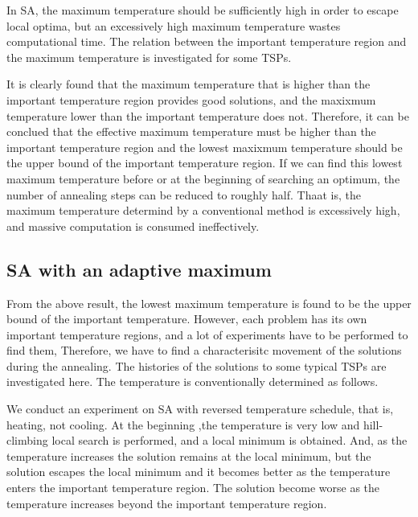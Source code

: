 \documentclass[pdftex,11pt]{article}
\begin{document}
In SA, the maximum temperature should be sufficiently high in order to escape local optima, but an excessively high maximum temperature wastes computational time. The relation between the important temperature region and the maximum temperature is investigated for some TSPs.

It is clearly found that the maximum temperature that is higher than the important temperature region provides good solutions, and the maxixmum temperature lower than the important temperature does not. Therefore, it can be conclued that the effective maximum temperature must be higher than the important temperature region and the lowest maxixmum temperature should be the upper bound of the important temperature region. If we can find this lowest maximum temperature before or at the beginning of searching an optimum, the number of annealing steps can be reduced to roughly half. Thaat is, the maximum temperature determind by a conventional method is excessively high, and massive computation is consumed ineffectively.

\subsection{SA with an adaptive maximum}
From the above result, the lowest maximum temperature is found to be the upper bound of the important temperature. However, each problem has its own important temperature regions, and a lot of experiments have to be performed to find them, Therefore, we have to find a characterisitc movement of the solutions during the annealing. The histories of the solutions to some typical TSPs are investigated here. The temperature is conventionally determined as follows.

We conduct an experiment on SA with reversed temperature schedule, that is, heating, not cooling. At the beginning ,the temperature is very low and hill-climbing local search is performed, and a local minimum is obtained. And, as the temperature increases the solution remains at the local minimum, but the solution escapes the local minimum and it becomes better as the temperature enters the important temperature region. The solution become worse as the temperature increases beyond the important temperature region.
\end{document}
